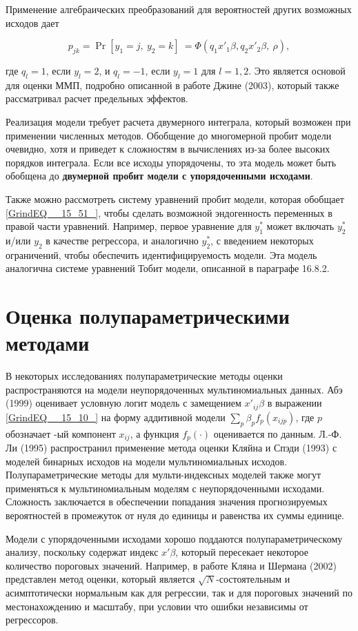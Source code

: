 Применение алгебраических преобразований для вероятностей других возможных исходов дает 

\[p_{jk}={\Pr  \left[y_1=j,\ y_2=k\right]\ }=\Phi \left(q_1x'_1\beta ,q_2x'_2\beta ,\ \rho \right),\] 

где $q_l=1$, если $y_l=2$, и $q_l=-1$, если $y_l=1$ для $l=1,2$. Это является основой для оценки ММП, подробно описанной в работе Джине (2003), который также рассматривал расчет предельных эффектов.

Реализация модели требует расчета двумерного интеграла, который возможен при применении численных методов. Обобщение до многомерной пробит модели очевидно, хотя и приведет к сложностям в вычислениях из-за более высоких порядков интеграла. Если все исходы упорядочены, то эта модель может быть обобщена до \textbf{двумерной пробит модели с упорядоченными исходами}.

Также можно рассмотреть систему уравнений пробит модели, которая обобщает \eqref{GrindEQ__15_51_}, чтобы сделать возможной эндогенность переменных в правой части уравнений. Например, первое уравнение для $y^*_1$ может включать $y^*_2$ и/или $y_2$ в качестве регрессора, и аналогично $y^*_2$, с введением некоторых ограничений, чтобы обеспечить идентифицируемость модели. Эта модель аналогична системе уравнений Тобит модели, описанной в параграфе 16.8.2.

\section{ Оценка полупараметрическими методами}

В некоторых исследованиях полупараметрические методы оценки распространяются на модели неупорядоченных мультиномиальных данных. Абэ (1999) оценивает условную логит модель с замещением $x'_{ij}\beta $ в выражении \eqref{GrindEQ__15_10_} на форму аддитивной модели $\sum_p{{\beta }_pf_p(x_{ijp})}$, где $p$ обозначает -ый компонент $x_{ij}$, а функция $f_p(\cdot )$ оценивается по данным. Л.-Ф. Ли (1995) распространил применение метода оценки Кляйна и Спэди (1993) с моделей бинарных исходов на модели мультиномиальных исходов. Полупараметрические методы для мульти-индексных моделей также могут применяться к мультиномиальным моделям с неупорядоченными исходами. Сложность заключается в обеспечении попадания значения прогнозируемых вероятностей в промежуток от нуля до единицы и равенства их суммы единице.

Модели с упорядоченными исходами хорошо поддаются полупараметрическому анализу, поскольку содержат индекс $x'\beta $, который пересекает некоторое количество пороговых значений. Например, в работе Кляна и Шермана (2002) представлен метод оценки, который является $\sqrt{N}$-состоятельным и асимптотически нормальным как для регрессии, так и для пороговых значений по местонахождению и масштабу, при условии что ошибки независимы от регрессоров. 


